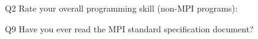 \begin{description}%
\item{Q2} Rate your overall programming skill (non-MPI programs):%
\item{Q9} Have you ever read the MPI standard specification document?%
\end{description}%
